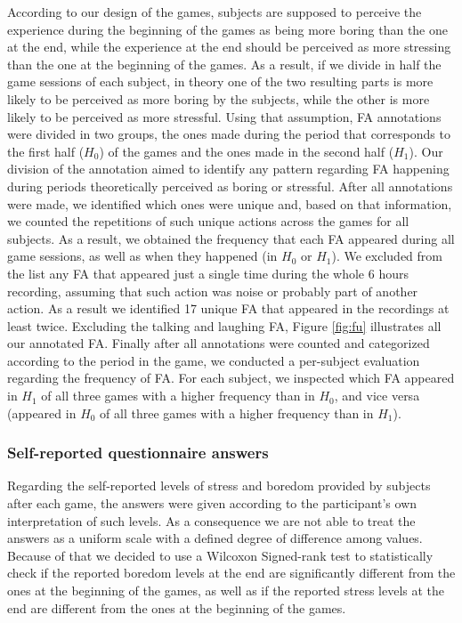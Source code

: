 According to our design of the games, subjects are supposed to perceive the experience during the beginning of the games as being more boring than the one at the end, while the experience at the end should be perceived as more stressing than the one at the beginning of the games. As a result, if we divide in half the game sessions of each subject, in theory one of the two resulting parts is more likely to be perceived as more boring by the subjects, while the other is more likely to be perceived as more stressful. Using that assumption, FA annotations were divided in two groups, the ones made during the period that corresponds to the first half ($H_0$) of the games and the ones made in the second half ($H_1$). Our division of the annotation aimed to identify any pattern regarding FA happening during periods theoretically perceived as boring or stressful. After all annotations were made, we identified which ones were unique and, based on that information, we counted the repetitions of such unique actions across the games for all subjects. As a result, we obtained the frequency that each FA appeared during all game sessions, as well as when they happened (in $H_0$ or $H_1$). We excluded from the list any FA that appeared just a single time during the whole 6 hours recording, assuming that such action was noise or probably part of another action. As a result we identified 17 unique FA that appeared in the recordings at least twice. Excluding the talking and laughing FA, Figure \ref{fig:fu} illustrates all our annotated FA. Finally after all annotations were counted and categorized according to the period in the game, we conducted a per-subject evaluation regarding the frequency of FA. For each subject, we inspected which FA appeared in $H_1$ of all three games with a higher frequency than in $H_0$, and vice versa (appeared in $H_0$ of all three games with a higher frequency than in $H_1$).

\subsubsection{Self-reported questionnaire answers}

Regarding the self-reported levels of stress and boredom provided by subjects after each game, the answers were given according to the participant's own interpretation of such levels. As a consequence we are not able to treat the answers as a uniform scale with a defined degree of difference among values. Because of that we decided to use a Wilcoxon Signed-rank test to statistically check if the reported boredom levels at the end are significantly different from the ones at the beginning of the games, as well as if the reported stress levels at the end are different from the ones at the beginning of the games.


